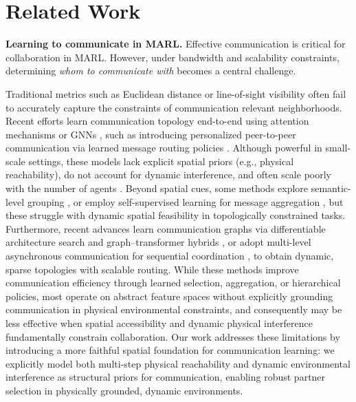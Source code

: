 \documentclass[10pt]{article} %
\begin{document}
\section{Related Work}
\textbf{Learning to communicate in MARL.} Effective communication is critical for collaboration in MARL. However, under bandwidth and scalability constraints, determining \emph{whom to communicate with} becomes a central challenge.

Traditional metrics such as Euclidean distance or line-of-sight visibility often fail to accurately capture the constraints of communication relevant neighborhoods. Recent efforts learn communication topology end-to-end using attention mechanisms or GNNs \cite{naderializadeh2020graph, hu2024learning, niu2021multiagent, su2020counterfactual}, such as introducing personalized peer-to-peer communication via learned message routing policies \cite{meng2024pmac}. Although powerful in small-scale settings, these models lack explicit spatial priors (e.g., physical reachability), do not account for dynamic interference, and often scale poorly with the number of agents \cite{christianos2021scaling}. Beyond spatial cues, some methods explore semantic-level grouping \cite{10.5555/3237383.3238080}, or employ self-supervised learning for message aggregation \cite{guan2022efficient}, but these struggle with dynamic spatial feasibility in topologically constrained tasks. Furthermore, recent advances learn communication graphs via differentiable architecture search and graph–transformer hybrids \cite{zhang2025bridging, inala2020neurosymbolic}, or adopt multi-level asynchronous communication for sequential coordination \cite{ding2024multi}, to obtain dynamic, sparse topologies with scalable routing. While these methods improve communication efficiency through learned selection, aggregation, or hierarchical policies, most operate on abstract feature spaces without explicitly grounding communication in physical environmental constraints, and consequently may be less effective when spatial accessibility and dynamic physical interference fundamentally constrain collaboration. Our work addresses these limitations by introducing a more faithful spatial foundation for communication learning: we explicitly model both multi-step physical reachability and dynamic environmental interference as structural priors for communication, enabling robust partner selection in physically grounded, dynamic environments.
\end{document}
